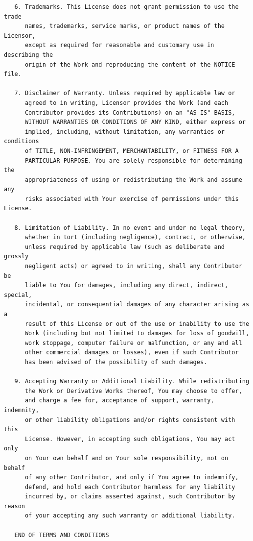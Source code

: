 \documentclass[]{report}
\begin{document}
\begin{verbatim}
   6. Trademarks. This License does not grant permission to use the trade
      names, trademarks, service marks, or product names of the Licensor,
      except as required for reasonable and customary use in describing the
      origin of the Work and reproducing the content of the NOTICE file.

   7. Disclaimer of Warranty. Unless required by applicable law or
      agreed to in writing, Licensor provides the Work (and each
      Contributor provides its Contributions) on an "AS IS" BASIS,
      WITHOUT WARRANTIES OR CONDITIONS OF ANY KIND, either express or
      implied, including, without limitation, any warranties or conditions
      of TITLE, NON-INFRINGEMENT, MERCHANTABILITY, or FITNESS FOR A
      PARTICULAR PURPOSE. You are solely responsible for determining the
      appropriateness of using or redistributing the Work and assume any
      risks associated with Your exercise of permissions under this License.

   8. Limitation of Liability. In no event and under no legal theory,
      whether in tort (including negligence), contract, or otherwise,
      unless required by applicable law (such as deliberate and grossly
      negligent acts) or agreed to in writing, shall any Contributor be
      liable to You for damages, including any direct, indirect, special,
      incidental, or consequential damages of any character arising as a
      result of this License or out of the use or inability to use the
      Work (including but not limited to damages for loss of goodwill,
      work stoppage, computer failure or malfunction, or any and all
      other commercial damages or losses), even if such Contributor
      has been advised of the possibility of such damages.

   9. Accepting Warranty or Additional Liability. While redistributing
      the Work or Derivative Works thereof, You may choose to offer,
      and charge a fee for, acceptance of support, warranty, indemnity,
      or other liability obligations and/or rights consistent with this
      License. However, in accepting such obligations, You may act only
      on Your own behalf and on Your sole responsibility, not on behalf
      of any other Contributor, and only if You agree to indemnify,
      defend, and hold each Contributor harmless for any liability
      incurred by, or claims asserted against, such Contributor by reason
      of your accepting any such warranty or additional liability.

   END OF TERMS AND CONDITIONS
\end{verbatim}
\normalsize


\newpage
\pagestyle{plain} 


\end{document}
